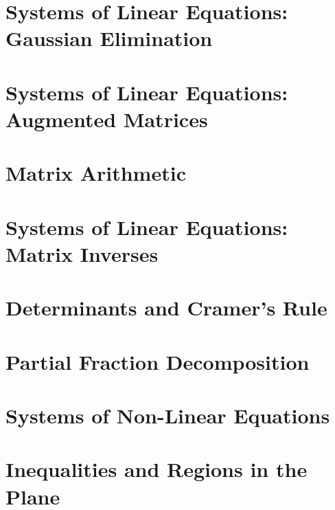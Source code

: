 \section{Systems of Linear Equations: Gaussian Elimination}



\newpage

\section{Systems of Linear Equations: Augmented Matrices}



\newpage

\section{Matrix Arithmetic}



\newpage

\section{Systems of Linear Equations: Matrix Inverses}



\newpage

\section{Determinants and Cramer's Rule}



\newpage

\section{Partial Fraction Decomposition}



\newpage

\section{Systems of Non-Linear Equations}



\newpage

\section{Inequalities and Regions in the Plane}



\newpage